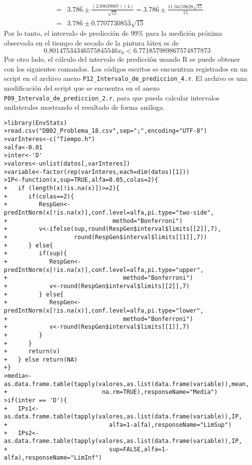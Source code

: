 \begin{solucion}
\begin{eqnarray*}
  & = & 3.78\overline{6} \pm \frac{(2.89039907)(4)}{\sqrt{15}} = 3.78\overline{6} \pm \frac{11.56159628 \sqrt{15}}{15} \\
  & = & 3.78\overline{6} \pm 0.770773085\overline{3}\sqrt{15}
 \end{eqnarray*}
 Por lo tanto, el intervalo de predicci\'on de $99\%$ para la medici\'on pr\'oxima observada en el tiempo de secado de la pintura l\'atex es de
 \begin{equation*}
  0.80147534346575845546 x_0 < 6.771857989867574877873
 \end{equation*}
 Por otro lado, el c\'alculo del intervalo de predicci\'on usando R se puede obtener con los siguientes comandos. Los c\'odigos escritos se encuentran registrados en un script en el archivo anexo \texttt{P12\_Intervalo\_de\_prediccion\_4.r}. El archivo es una modificaci\'on del script que se encuentra en el anexo \texttt{P09\_Intervalo\_de\_prediccion\_2.r}, para que pueda calcular intervalos unilaterales mostrando el resultado de forma an\'aloga.
 \begin{verbatim}
>library(EnvStats)
>read.csv("DB02_Problema_18.csv",sep=";",encoding="UTF-8")
>varInteres<-c("Tiempo.h")
>alfa<-0.01
>inter<-'D'
>valores<-unlist(datos[,varInteres])
>variable<-factor(rep(varInteres,each=dim(datos)[1]))
>IP<-function(x,sup=TRUE,alfa=0.05,colas=2){
+   if (length(x[!is.na(x)])>=2){
+      if(colas==2){
+         RespGen<-predIntNorm(x[!is.na(x)],conf.level=alfa,pi.type="two-side",
+                              method="Bonferroni")
+         v<-ifelse(sup,round(RespGen$interval$limits[[2]],7),
+                   round(RespGen$interval$limits[[1]],7))
+      } else{
+         if(sup){
+            RespGen<-predIntNorm(x[!is.na(x)],conf.level=alfa,pi.type="upper",
+                                 method="Bonferroni")
+            v<-round(RespGen$interval$limits[[2]],7)
+         } else{
+            RespGen<-predIntNorm(x[!is.na(x)],conf.level=alfa,pi.type="lower",
+                                 method="Bonferroni")
+            v<-round(RespGen$interval$limits[[1]],7)
+         }
+      }
+      return(v)
+   } else return(NA)
+}
>media<-as.data.frame.table(tapply(valores,as.list(data.frame(variable)),mean,
+                           na.rm=TRUE),responseName="Media")
>if(inter == 'D'){
+   IPs1<-as.data.frame.table(tapply(valores,as.list(data.frame(variable)),IP,
+                             alfa=1-alfa),responseName="LimSup")
+   IPs2<-as.data.frame.table(tapply(valores,as.list(data.frame(variable)),IP,
+                             sup=FALSE,alfa=1-alfa),responseName="LimInf")

\end{verbatim}
\end{solucion}
